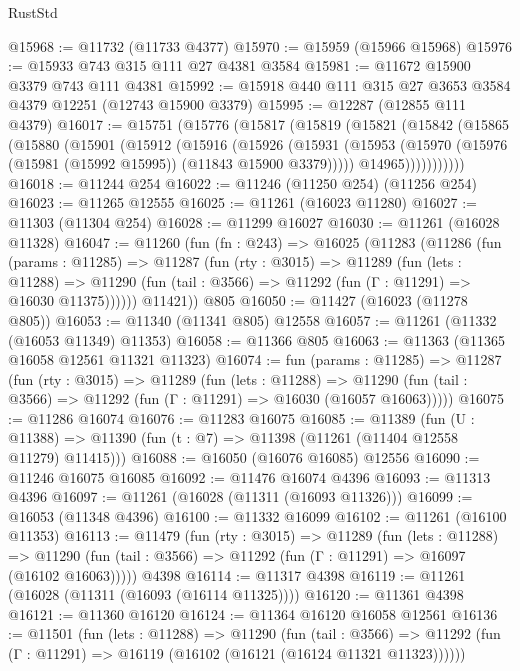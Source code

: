 \begin{lexlean}{RustStd}
\begin{coremodule}
@15968 := @11732 (@11733 @4377)
@15970 := @15959 (@15966 @15968)
@15976 := @15933 @743 @315 @111 @27 @4381 @3584
@15981 := @11672 @15900 @3379 @743 @111 @4381
@15992 := @15918 @440 @111 @315 @27 @3653 @3584 @4379 @12251 (@12743 @15900 @3379)
@15995 := @12287 (@12855 @111 @4379)
@16017 := @15751
    (@15776
      (@15817
        (@15819
          (@15821
            (@15842
              (@15865
                (@15880
                  (@15901
                    (@15912
                      (@15916
                        (@15926
                          (@15931
                            (@15953
                              (@15970 (@15976 (@15981 (@15992 @15995)) (@11843 @15900 @3379)))))
                          @14965)))))))))))
@16018 := @11244 @254
@16022 := @11246 (@11250 @254) (@11256 @254)
@16023 := @11265 @12555
@16025 := @11261 (@16023 @11280)
@16027 := @11303 (@11304 @254)
@16028 := @11299 @16027
@16030 := @11261 (@16028 @11328)
@16047 := @11260
    (fun (fn : @243) =>
    @16025
      (@11283
        (@11286
          (fun (params : @11285) =>
          @11287
            (fun (rty : @3015) =>
            @11289
              (fun (lets : @11288) =>
              @11290 (fun (tail : @3566) => @11292 (fun (Γ : @11291) => @16030 @11375))))))
        @11421))
    @805
@16050 := @11427 (@16023 (@11278 @805))
@16053 := @11340 (@11341 @805) @12558
@16057 := @11261 (@11332 (@16053 @11349) @11353)
@16058 := @11366 @805
@16063 := @11363 (@11365 @16058 @12561 @11321 @11323)
@16074 := fun (params : @11285) =>
  @11287
    (fun (rty : @3015) =>
    @11289
      (fun (lets : @11288) =>
      @11290 (fun (tail : @3566) => @11292 (fun (Γ : @11291) => @16030 (@16057 @16063)))))
@16075 := @11286 @16074
@16076 := @11283 @16075
@16085 := @11389
    (fun (U : @11388) => @11390 (fun (t : @7) => @11398 (@11261 (@11404 @12558 @11279) @11415)))
@16088 := @16050 (@16076 @16085) @12556
@16090 := @11246 @16075 @16085
@16092 := @11476 @16074 @4396
@16093 := @11313 @4396
@16097 := @11261 (@16028 (@11311 (@16093 @11326)))
@16099 := @16053 (@11348 @4396)
@16100 := @11332 @16099
@16102 := @11261 (@16100 @11353)
@16113 := @11479
    (fun (rty : @3015) =>
    @11289
      (fun (lets : @11288) =>
      @11290 (fun (tail : @3566) => @11292 (fun (Γ : @11291) => @16097 (@16102 @16063)))))
    @4398
@16114 := @11317 @4398
@16119 := @11261 (@16028 (@11311 (@16093 (@16114 @11325))))
@16120 := @11361 @4398
@16121 := @11360 @16120
@16124 := @11364 @16120 @16058 @12561
@16136 := @11501
    (fun (lets : @11288) =>
    @11290
      (fun (tail : @3566) =>
      @11292 (fun (Γ : @11291) => @16119 (@16102 (@16121 (@16124 @11321 @11323))))))

\end{coremodule}
\end{lexlean}
